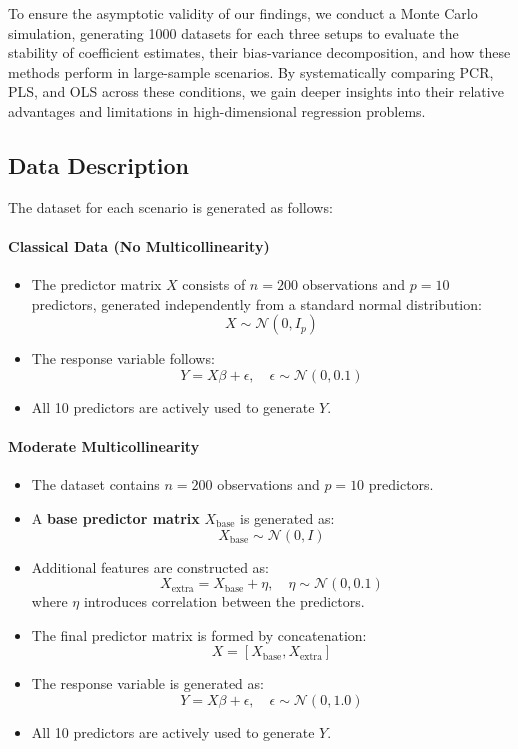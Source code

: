 \documentclass[11pt,twoside,a4paper]{article}
\begin{document}
To ensure the asymptotic validity of our findings, we conduct a Monte Carlo simulation, generating 1000 datasets for each three setups to evaluate the stability of coefficient estimates, their bias-variance decomposition, and how these methods perform in large-sample scenarios. By systematically comparing PCR, PLS, and OLS across these conditions, we gain deeper insights into their relative advantages and limitations in high-dimensional regression problems.


\subsection{Data Description}
The dataset for each scenario is generated as follows:

\paragraph{Classical Data (No Multicollinearity)}
\begin{itemize}
    \item The predictor matrix \( X \) consists of \( n = 200 \) observations and \( p = 10 \) predictors, generated independently from a standard normal distribution:
    \[ X \sim \mathcal{N}(0, I_p) \]
    \item The response variable follows:
    \[ Y = X \beta + \epsilon, \quad \epsilon \sim \mathcal{N}(0, 0.1) \]
    \item All 10 predictors are actively used to generate \( Y \).
\end{itemize}

\paragraph{Moderate Multicollinearity}
\begin{itemize}
    \item The dataset contains \( n = 200 \) observations and \( p = 10 \) predictors.
    \item A \textbf{base predictor matrix} \( X_{\text{base}} \) is generated as:
    \[ X_{\text{base}} \sim \mathcal{N}(0, I) \]
    \item Additional features are constructed as:
    \[ X_{\text{extra}} = X_{\text{base}} + \eta, \quad \eta \sim \mathcal{N}(0, 0.1) \]
    where \( \eta \) introduces correlation between the predictors.
    \item The final predictor matrix is formed by concatenation:
    \[ X = [X_{\text{base}}, X_{\text{extra}}] \]
    \item The response variable is generated as:
    \[ Y = X \beta + \epsilon, \quad \epsilon \sim \mathcal{N}(0, 1.0) \]
    \item All 10 predictors are actively used to generate \( Y \).
\end{itemize}
\end{document}
